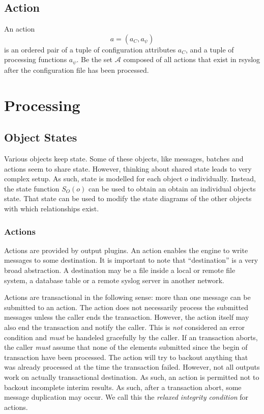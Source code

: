 \documentclass[a4paper,10pt]{article}
\newcommand{\AAA}{\mathcal{A}}
\begin{document}
\subsection{Action}
An action
$$a = (a_C, a_\psi)$$
is an ordered pair of a tuple of configuration attributes $a_C$, and a tuple of processing functions $a_\psi$. Be the set $\AAA$ composed of all actions that exist in rsyslog after the configuration file has been processed.


\section{Processing}
\subsection{Object States}
Various objects keep state. Some of these objects, like messages, batches and actions seem to share state. However, thinking about shared state leads to very complex setup. As such, state is modelled for each object $o$ individually. Instead, the state function $S_O(o)$ can be used to obtain an obtain an individual objects state. That state can be used to modify the state diagrams of the other objects with which relationships exist.

\subsubsection{Actions}
Actions are provided by output plugins. An action enables the engine to write messages to some destination. It is important to note that ``destination'' is a very broad abstraction. A destination may be a file inside a local or remote file system, a database table or a remote syslog server in another network.

Actions are transactional in the following sense: more than one message can be submitted to an action. The action does not necessarily process the submitted messages unless the caller ends the transaction. However, the action itself may also end the transaction and notify the caller. This is \emph{not} considered an error condition and \emph{must} be handeled gracefully by the caller. If an transaction aborts, the caller \emph{must} assume that none of the elements submitted since the begin of transaction have been processed. The action will try to backout anything that was already processed at the time the transaction failed. However, not all outputs work on actually transactional destination. As such, an action is permitted not to backout incomplete interim results. As such, after a transaction abort, some message duplication may occur. We call this the \emph{relaxed integrity condition} for actions.
\end{document}

